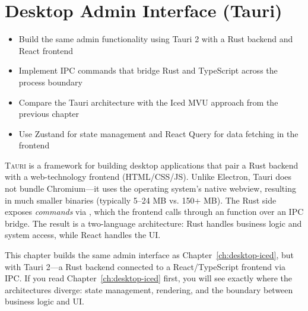 \chapter{Desktop Admin Interface (Tauri)}
\label{ch:desktop-tauri}

\begin{learnbox}
\begin{itemize}
  \item Build the same admin functionality using Tauri 2 with a Rust backend and React frontend
  \item Implement IPC commands that bridge Rust and TypeScript across the process boundary
  \item Compare the Tauri architecture with the Iced MVU approach from the previous chapter
  \item Use Zustand for state management and React Query for data fetching in the frontend
\end{itemize}
\end{learnbox}

\lettrine{T}{auri} is a framework for building desktop applications that pair a Rust backend with a web-technology frontend (HTML/CSS/JS). Unlike Electron, Tauri does not bundle Chromium---it uses the operating system's native webview, resulting in much smaller binaries (typically 5--24 MB vs. 150+ MB). The Rust side exposes \emph{commands} via , which the frontend calls through an  function over an IPC bridge. The result is a two-language architecture: Rust handles business logic and system access, while React handles the UI.

\begin{notebox}
This chapter builds the same admin interface as Chapter~\ref{ch:desktop-iced}, but with Tauri 2---a Rust backend connected to a React/TypeScript frontend via IPC. If you read Chapter~\ref{ch:desktop-iced} first, you will see exactly where the architectures diverge: state management, rendering, and the boundary between business logic and UI.
\end{notebox}

